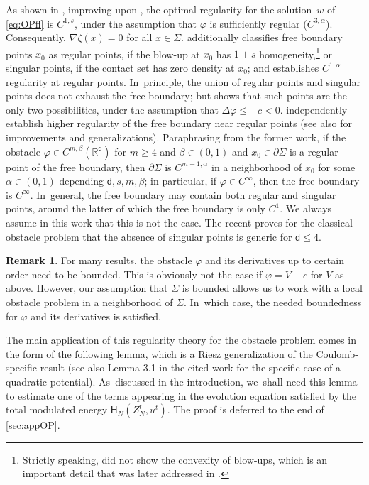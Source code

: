 \documentclass[JEP,XML,SOM,Unicode,published]{cedram}
\theoremstyle{plain}
\theoremstyle{definition}
\newtheorem{remark}[thm]{Remark}
\newcommand{\R}{{\mathbb{R}}}
\let\al\alpha
\let\be\beta
\let\D\Delta
\let\p\partial
\newcommand{\Hr}{\mathsf{H}}
\renewcommand{\d}{\mathsf{d}}
\begin{document}
As shown in \cite{CSS2008}, improving upon \cite{Silvestre2007}, the optimal regularity for the solution~$w$ of \eqref{eq:OPfl} is $C^{1,s}$, under the assumption that $\varphi$ is sufficiently regular (\eg $C^{3,\al}$). Consequently, $\nabla\zeta(x) = 0$ for all $x\in\Sigma$. \cite{CSS2008} additionally classifies free boundary points $x_0$ as regular points, if the blow-up at $x_0$ has $1+s$ homogeneity,\footnote{{Strictly speaking, \cite{CSS2008} did not show the convexity of blow-ups, which is an important detail that was later addressed in \cite{fRJ2021, CDV2022}.}} or singular points, if the contact set has zero density at $x_0$; and establishes $C^{1,\al}$ regularity at regular points. In~principle, the union of regular points and singular points does not exhaust the free boundary; but \cite{BFRo2018} shows that such points are the only two possibilities, under the assumption that $\D\varphi\leq -c< 0$. \cite{JN2017, KRS2019} independently establish higher regularity of the free boundary near regular points {(see also \cite{ArO2020} for improvements and generalizations)}. Paraphrasing from the former work, if the obstacle $\varphi\in C^{m,\be}(\R^\d)$ for $m\geq 4$ and $\be\in (0,1)$ and $x_0\in \p\Sigma$ is a regular point of the free boundary, then $\p\Sigma$ is $C^{m-1,\al}$ in a neighborhood of $x_0$ for some $\al\in (0,1)$ depending $\d,s,m,\be$; in particular, if $\varphi\in C^\infty$, then the free boundary is $C^\infty$. In~general, the free boundary may contain both regular and singular points, around the latter of which the free boundary is only $C^1$. We always assume in this work that this is not the case. The recent \cite{FRoS2020} proves for the classical obstacle problem that the absence of singular points is generic for $\d\leq 4$.

\begin{remark}
For many results, the obstacle $\varphi$ and its derivatives up to certain order need to be bounded. This is obviously not the case if $\varphi = V-c$ for $V$ as above. However, our assumption that $\Sigma$ is bounded allows us to work with a local obstacle problem in a neighborhood of $\Sigma$. In~which case, the needed boundedness for $\varphi$ and its derivatives is satisfied.
\end{remark}

The main application of this regularity theory for the obstacle problem comes in the form of the following lemma, which is a Riesz generalization of the Coulomb-specific result \cite[Lem.\,3.2]{BCGM2015} (see also Lemma 3.1 in the cited work for the specific case of a quadratic potential). As~discussed in the introduction, we~shall need this lemma to estimate one of the terms appearing in the evolution equation satisfied by the total modulated energy $\Hr_N(Z_N^t,u^t)$. {The proof is deferred to the end of \cref{sec:appOP}.}
\end{document}
